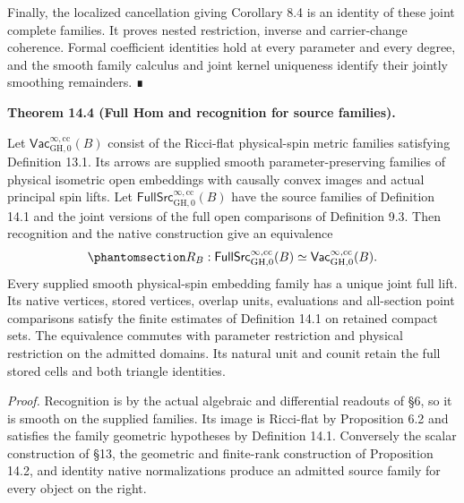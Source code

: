 \documentclass[
  english,
  11pt,
  reqno]{amsart}
\makeatletter
\newcommand{\pandocstatementheading}[1]{%
  \par\addpenalty{\@beginparpenalty}%
  \addvspace{.5\baselineskip plus .2\baselineskip minus .2\baselineskip}%
  {\normalfont\bfseries #1\par}%
  \nobreak\@afterindenttrue\@afterheading
}
\makeatother
\begin{document}
Finally, the localized cancellation giving Corollary 8.4 is an identity
of these joint complete families. It proves nested restriction, inverse
and carrier-change coherence. Formal coefficient identities hold at
every parameter and every degree, and the smooth family calculus and
joint kernel uniqueness identify their jointly smoothing remainders. ∎

\pandocstatementheading{\protect{}\label{thm:family-full-source-hom}Theorem 14.4 (Full Hom and recognition for source families).}

Let \(\mathsf{Vac}^{\infty,\mathrm{cc}}_{\mathrm{GH},0}(B)\) consist of
the Ricci-flat physical-spin metric families satisfying Definition 13.1.
Its arrows are supplied smooth parameter-preserving families of physical
isometric open embeddings with causally convex images and actual
principal spin lifts. Let
\(\mathsf{FullSrc}^{\infty,\mathrm{cc}}_{\mathrm{GH},0}(B)\) have the
source families of Definition 14.1 and the joint versions of the full
open comparisons of Definition 9.3. Then recognition and the native
construction give an equivalence
\begin{equation}\protect\phantomsection\label{eq:family-full-source-equivalence}{
R_B:\mathsf{FullSrc}^{\infty,\mathrm{cc}}_{\mathrm{GH},0}(B)
\simeq
\mathsf{Vac}^{\infty,\mathrm{cc}}_{\mathrm{GH},0}(B).
}\end{equation} Every supplied smooth physical-spin embedding family has
a unique joint full lift. Its native vertices, stored vertices, overlap
units, evaluations and all-section point comparisons satisfy the finite
estimates of Definition 14.1 on retained compact sets. The equivalence
commutes with parameter restriction and physical restriction on the
admitted domains. Its natural unit and counit retain the full stored
cells and both triangle identities.

\emph{Proof.} Recognition is by the actual algebraic and differential
readouts of §6, so it is smooth on the supplied families. Its image is
Ricci-flat by Proposition 6.2 and satisfies the family geometric
hypotheses by Definition 14.1. Conversely the scalar construction of
§13, the geometric and finite-rank construction of Proposition 14.2, and
identity native normalizations produce an admitted source family for
every object on the right.
\end{document}
